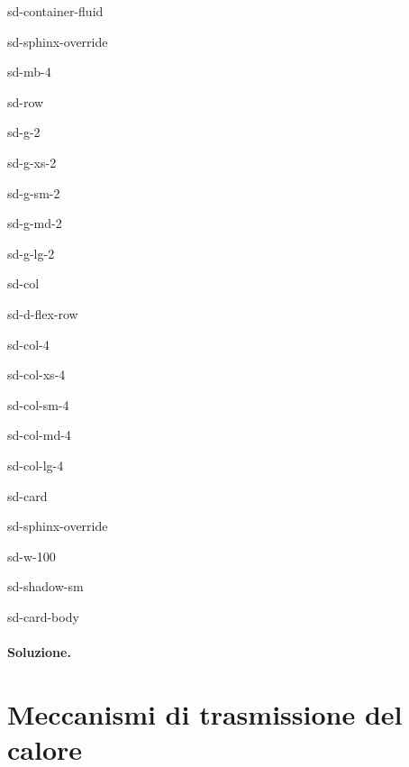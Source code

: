 \documentclass[letterpaper,10pt,italian]{jupyterBook}
\begin{document}
\begin{sphinxuseclass}{sd-container-fluid}
\begin{sphinxuseclass}{sd-sphinx-override}
\begin{sphinxuseclass}{sd-mb-4}
\begin{sphinxuseclass}{sd-row}
\begin{sphinxuseclass}{sd-g-2}
\begin{sphinxuseclass}{sd-g-xs-2}
\begin{sphinxuseclass}{sd-g-sm-2}
\begin{sphinxuseclass}{sd-g-md-2}
\begin{sphinxuseclass}{sd-g-lg-2}
\begin{sphinxuseclass}{sd-col}
\begin{sphinxuseclass}{sd-d-flex-row}
\begin{sphinxuseclass}{sd-col-4}
\begin{sphinxuseclass}{sd-col-xs-4}
\begin{sphinxuseclass}{sd-col-sm-4}
\begin{sphinxuseclass}{sd-col-md-4}
\begin{sphinxuseclass}{sd-col-lg-4}
\begin{sphinxuseclass}{sd-card}
\begin{sphinxuseclass}{sd-sphinx-override}
\begin{sphinxuseclass}{sd-w-100}
\begin{sphinxuseclass}{sd-shadow-sm}
\begin{sphinxuseclass}{sd-card-body}
\end{sphinxuseclass}
\end{sphinxuseclass}
\end{sphinxuseclass}
\end{sphinxuseclass}
\end{sphinxuseclass}
\end{sphinxuseclass}
\end{sphinxuseclass}
\end{sphinxuseclass}
\end{sphinxuseclass}
\end{sphinxuseclass}
\end{sphinxuseclass}
\end{sphinxuseclass}
\end{sphinxuseclass}
\end{sphinxuseclass}
\end{sphinxuseclass}
\end{sphinxuseclass}
\end{sphinxuseclass}
\end{sphinxuseclass}
\end{sphinxuseclass}
\end{sphinxuseclass}
\end{sphinxuseclass}\subsubsection*{Soluzione.}

\sphinxstepscope


\chapter{Meccanismi di trasmissione del calore}
\label{\detokenize{ch/thermodynamics/heat-transmission:meccanismi-di-trasmissione-del-calore}}\label{\detokenize{ch/thermodynamics/heat-transmission:physics-hs-thermodynamics-heat-transmission}}\label{\detokenize{ch/thermodynamics/heat-transmission::doc}}
\sphinxstepscope
\end{document}
